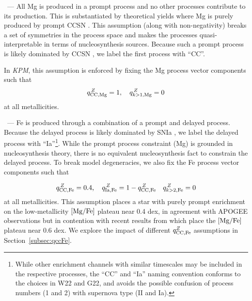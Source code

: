 \documentclass[modern]{aastex631}
\newcommand{\mgfe}[0]{[{\rm Mg/Fe}]}
\newcommand{\qccFe}{q_{{\rm CC, Fe}}^{Z}}
\newcommand{\name}{\textsl{KPM}}
\renewcommand{\paragraph}[1]{\bigskip\par\noindent{\textbf{#1}}~---}
\begin{document}
\paragraph{4. Mg production}
All Mg is produced in a prompt process and no other processes contribute to its production.
This is substantiated by theoretical yields where Mg is purely produced by prompt CCSN \citep[e.g.,][]{anderson2019, rybizki2017}.
This assumption (along with non-negativity) breaks a set of symmetries in the process space and makes the processes quasi-interpretable in terms of nucleosynthesis sources.
Because such a prompt process is likely dominated by CCSN \citep[e.g.,][]{andrews2017}, we label the first process with ``CC''. 

In \name{}, this assumption is enforced by fixing the Mg process vector components such that
\begin{equation}\label{eq:qcc_mg_solar}
    q_{{\rm CC, Mg}}^{\,Z} = 1, \quad q_{k>1,{\rm Mg}}^{\,Z} = 0
\end{equation}
at all metallicities. 

\paragraph{5. Fe production}
Fe is produced through a combination of a prompt and delayed process. Because the delayed process is likely dominated by SNIa \citep[e.g.,][]{andrews2017}, we label the delayed process with ``Ia''\footnote{While other enrichment channels with similar timescales may be included in the respective processes, the ``CC'' and ``Ia'' naming convention conforms to the choices in W22 and G22, and avoids the possible confusion of process numbers (1 and 2) with supernova type (II and Ia).}.
While the prompt process constraint (Mg) is grounded in nucleosynthesis theory, there is no equivalent nucleosynthesis fact to constrain the delayed process.
To break model degeneracies, we also fix the Fe process vector components such that 

\begin{equation}\label{eq:qcc_fe_solar}
    q_{{\rm CC, Fe}}^{\,Z} = 0.4, \quad q_{{\rm Ia, Fe}}^{\,Z} = 1 - q_{{\rm CC, Fe}}^{\,Z} \quad q_{k>2,{\rm Fe}}^{\,Z} = 0
\end{equation}
at all metallicities. 
This assumption places a star with purely prompt enrichment on the low-metallicity $\mgfe$ plateau near 0.4 dex, in agreement with APOGEE observations but in contention with recent results from \citet{conroy2022} which place the $\mgfe$ plateau near 0.6 dex.
We explore the impact of different $\qccFe$ assumptions in Section~\ref{subsec:qccFe}.
\end{document}
